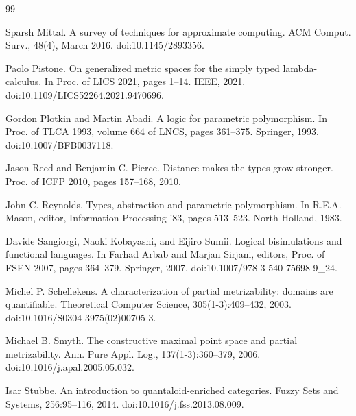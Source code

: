 \documentclass[10pt,a4paper]{amsart}
\begin{document}
\begin{thebibliography}{99}
\par\noindent  [28]  Sparsh Mittal.  A survey of techniques for approximate computing.  ACM Comput. Surv., 48(4), March 2016.  doi:10.1145/2893356.  
 
\par\noindent  [29]  Paolo Pistone.  On generalized metric spaces for the simply typed lambda-calculus.  In Proc. of LICS 2021, pages 1–14. IEEE, 2021.  doi:10.1109/LICS52264.2021.9470696.  
 
\par\noindent  [30]  Gordon Plotkin and Martin Abadi.  A logic for parametric polymorphism.  In Proc. of TLCA 1993, volume 664 of LNCS, pages 361–375. Springer, 1993.  doi:10.1007/BFB0037118.  
 
\par\noindent  [31]  Jason Reed and Benjamin C. Pierce.  Distance makes the types grow stronger.  Proc. of ICFP 2010, pages 157–168, 2010.  
 
\par\noindent  [32]  John C. Reynolds.  Types, abstraction and parametric polymorphism.  In R.E.A. Mason, editor, Information Processing ’83, pages 513–523. North-Holland, 1983.  
 
\par\noindent  [33]  Davide Sangiorgi, Naoki Kobayashi, and Eijiro Sumii.  Logical bisimulations and functional languages.  In Farhad Arbab and Marjan Sirjani, editors, Proc. of FSEN 2007, pages 364–379. Springer, 2007.  doi:10.1007/978-3-540-75698-9\_24.  
 
\par\noindent  [34]  Michel P. Schellekens.  A characterization of partial metrizability: domains are quantifiable.  Theoretical Computer Science, 305(1-3):409–432, 2003.  doi:10.1016/S0304-3975(02)00705-3.  
 
\par\noindent  [35]  Michael B. Smyth.  The constructive maximal point space and partial metrizability.  Ann. Pure Appl. Log., 137(1-3):360–379, 2006.  doi:10.1016/j.apal.2005.05.032.  
 
\par\noindent  [36]  Isar Stubbe.  An introduction to quantaloid-enriched categories.  Fuzzy Sets and Systems, 256:95–116, 2014.  doi:10.1016/j.fss.2013.08.009.  
  
\end{thebibliography}
\end{document}
